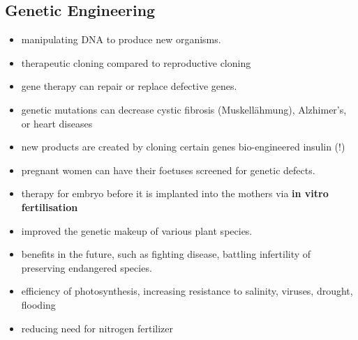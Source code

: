 \documentclass[a5paper,12pt,twoside,titlepage]{scrartcl}
\begin{document}
		\subsection{Genetic Engineering}
		\begin{itemize}
			\item manipulating DNA to produce new organisms.
			\item therapeutic cloning compared to reproductive cloning
			\item gene therapy can repair or replace defective genes. 
			\item genetic mutations can decrease cystic fibrosis (Muskellähmung), Alzhimer's, or heart diseases
			\item new products are created by cloning certain genes \textrightarrow bio-engineered insulin (!)
			\item pregnant women can have their foetuses screened for genetic defects.
			\item therapy for embryo before it is implanted into the mothers via \textbf{in vitro fertilisation}	
			\item improved the genetic makeup of various plant species. 
			\item benefits in the future, such as fighting disease, battling infertility of preserving endangered species. 
			\item efficiency of photosynthesis, increasing resistance to salinity, viruses, drought, flooding
			\item reducing need for nitrogen fertilizer
		\end{itemize}
\end{document}

